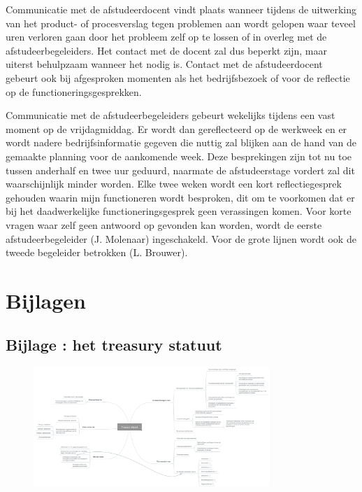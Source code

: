 \documentclass[10pt,a4paper,oneside]{report}
\newcounter{bijlage}[section] %
\begin{document}
Communicatie met de afstudeerdocent vindt plaats wanneer tijdens de uitwerking van het product- of procesverslag tegen problemen aan wordt gelopen waar teveel uren verloren gaan door het probleem zelf op te lossen of in overleg met de afstudeerbegeleiders. Het contact met de docent zal dus beperkt zijn, maar uiterst behulpzaam wanneer het nodig is. Contact met de afstudeerdocent gebeurt ook bij afgesproken momenten als het bedrijfsbezoek of voor de reflectie op de functioneringsgesprekken.

Communicatie met de afstudeerbegeleiders gebeurt wekelijks tijdens een vast moment op de vrijdagmiddag. Er wordt dan gereflecteerd op de werkweek en er wordt nadere bedrijfsinformatie gegeven die nuttig zal blijken aan de hand van de gemaakte planning voor de aankomende week. Deze besprekingen zijn tot nu toe tussen anderhalf en twee uur geduurd, naarmate de afstudeerstage vordert zal dit waarschijnlijk minder worden. Elke twee weken wordt een kort reflectiegesprek gehouden waarin mijn functioneren wordt besproken, dit om te voorkomen dat er bij het daadwerkelijke functioneringsgesprek geen verassingen komen. Voor korte vragen waar zelf geen antwoord op gevonden kan worden, wordt de eerste afstudeerbegeleider (J. Molenaar) ingeschakeld. Voor de grote lijnen wordt ook de tweede begeleider betrokken (L. Brouwer).

\printbibliography
{}

\newpage
\section*{Bijlagen}

\subsection*{\hypertarget{bij:treasury}{Bijlage \thebijlage}: het treasury statuut}
\begin{figure}[!h]
    \centering
    \includegraphics[angle=90,width=0.795\textwidth]{treasury}
    \label{fig:mmtreasury}
\end{figure}
\end{document}
